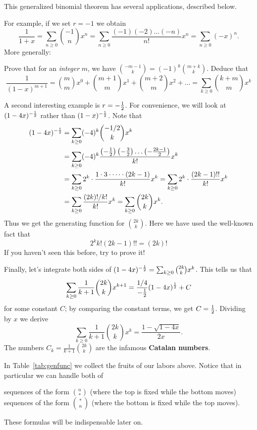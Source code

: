 \documentclass[11pt]{scrartcl}
\begin{document}
This generalized binomial theorem has several applications, described below.
\begin{itemize}
\ii For example, if we set $r = -1$ we obtain
\[
	\frac{1}{1+x}
	= \sum_{n \ge 0} \binom{-1}{n} x^n
	= \sum_{n \ge 0}
	\frac{(-1) (-2) \dots (-n)}{n!} x^n
	= \sum_{n \ge 0} (-x)^n.
\]
\ii More generally:
\begin{exercise}
	Prove that for an \emph{integer} $m$, we have
	$\binom{-m-1}{k} = (-1)^k \binom{m+k}{k}$.
	Deduce that
	\[ 
		\frac{1}{(1-x)^{m+1}}
		= \binom{m}{m} x^0 + \binom{m+1}{m} x^1 + \binom{m+2}{m} x^2 + \dots
		= \sum_{k \ge 0} \binom{k+m}{m} x^k
	\]
\end{exercise}
\ii A second interesting example is $r = -\frac{1}{2}$.
For convenience, we will look at $(1-4x)^{-\frac{1}{2}}$
rather than $(1-x)^{-\frac{1}{2}}$.
Note that
\begin{align*}
	(1-4x)^{-\frac{1}{2}}
	&= \sum_{k \ge 0} (-4)^k \binom{-1/2}{k} x^k \\
	&= \sum_{k \ge 0} (-4)^k \frac{\left( -\frac12 \right)\left( -\frac32 \right)\dots
		\left( -\frac{2k-1}{2} \right)}{k!} x^k \\
	&= \sum_{k \ge 0} 2^k \cdot \frac{1 \cdot 3 \cdot \dots \cdot (2k-1)}{k!} x^k
		= \sum_{k \ge 0} 2^k \cdot \frac{(2k-1)!!}{k!} x^k \\
	&= \sum_{k \ge 0} \frac{(2k)!/k!}{k!} x^k
		= \sum_{k \ge 0} \binom{2k}{k} x^k.
\end{align*}
Thus we get the generating function for $\binom{2k}{k}$.
Here we have used the well-known fact that 
\[ 2^k k! (2k-1)!! = (2k)! \]
If you haven't seen this before, try to prove it!

\ii Finally, let's integrate both sides of
$(1-4x)^{-\frac{1}{2}} = \sum_{k \ge 0} \binom{2k}{k} x^k$.
This tells us that
\[ \sum_{k \ge 0} \frac{1}{k+1} \binom{2k}{k} x^{k+1}
	= \frac{1/4}{-\frac{1}{2}}(1-4x)^{\frac{1}{2}} + C \]
for some constant $C$; by comparing the constant terms, we get $C = \frac{1}{2}$.
Dividing by $x$ we derive
\[ \sum_{k \ge 0} \frac{1}{k+1} \binom{2k}{k} x^{k}
	= \frac{1 - \sqrt{1-4x}}{2x}. \]
The numbers $C_k = \frac{1}{k+1} \binom{2k}{k}$ are the
infamous \textbf{Catalan numbers}.
\end{itemize}

In Table~\ref{tab:genfunc} we collect the fruits of our labors above.
Notice that in particular we can handle both of
\begin{itemize}
	\ii sequences of the form $\binom{n}{\ast}$
	(where the top is fixed while the bottom moves)
	\ii sequences of the form $\binom{\ast}{n}$
	(where the bottom is fixed while the top moves).
\end{itemize}
These formulas will be indispensable later on.
\end{document}
